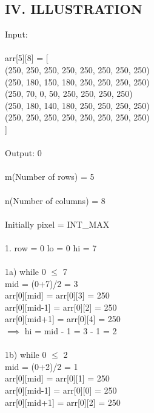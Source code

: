 \documentclass[10pt]{article}
\begin{document}
\begin{multicols*}{2}
\section*{IV. ILLUSTRATION} 

Input:\\\\ arr[5][8] = [\\(250, 250, 250, 250, 250, 250, 250, 250)\\(250, 180, 150, 180, 250, 250, 250, 250)\\(250, 70, 0, 50, 250, 250, 250, 250)\\(250, 180, 140, 180, 250, 250, 250, 250)\\(250, 250, 250, 250, 250, 250, 250, 250)\\]\\\\Output: 0\\\\m(Number of rows) = 5\\\\n(Number of columns) = 8\\\\Initially pixel = INT\_MAX\\\\1. row = 0 lo = 0 hi = 7\\\\1a) while 0 $\leq$ 7\\

        mid = (0+7)/2 = 3\\

        arr[0][mid] = arr[0][3] = 250\\

        arr[0][mid-1] = arr[0][2] = 250\\

        arr[0][mid+1] = arr[0][4] = 250\\
        
        $\implies$ hi = mid - 1 = 3 - 1 = 2\\\\1b) while 0 $\leq$ 2\\
    
        mid = (0+2)/2 = 1\\

        arr[0][mid] = arr[0][1] = 250\\

        arr[0][mid-1] = arr[0][0] = 250\\

        arr[0][mid+1] = arr[0][2] = 250\\
        

\end{multicols*}
\end{document}
